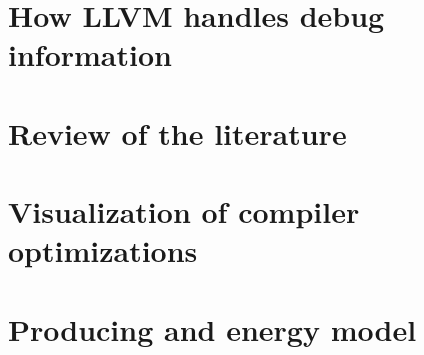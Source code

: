 \section{How LLVM handles debug information\label{sec:llvm-dbg}}
\section{Review of the literature}
\section{Visualization of compiler optimizations}
\section{Producing and energy model}